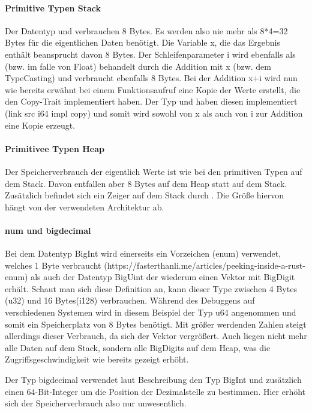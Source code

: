 \documentclass[11pt,a4paper, ngerman]{article}
\begin{document}
\paragraph{Primitive Typen Stack} Der Datentyp  und  verbrauchen 8 Bytes. Es werden also nie mehr als 8*4=32 Bytes für die eigentlichen Daten benötigt. Die Variable x, die das Ergebnis enthält beansprucht davon 8 Bytes. Der Schleifenparameter i wird ebenfalls als  (bzw.  im falle von Float) behandelt durch die Addition mit x (bzw. dem TypeCasting) und verbraucht ebenfalls 8 Bytes. Bei der Addition x+i wird nun wie bereits erwähnt bei einem Funktionsaufruf eine Kopie der Werte erstellt, die den Copy-Trait implementiert haben. Der Typ  und  haben diesen implementiert (link src i64 impl copy) und somit wird sowohl von x als auch von i zur Addition eine Kopie erzeugt.

\paragraph{Primitivee Typen Heap} Der Speicherverbrauch der eigentlich Werte ist wie bei den primitiven Typen auf dem Stack. Davon entfallen aber 8 Bytes auf dem Heap statt auf dem Stack. Zusätzlich befindet sich ein Zeiger auf dem Stack durch . Die Größe hiervon hängt von der verwendeten Architektur ab.

\paragraph{num und bigdecimal} Bei dem Datentyp BigInt wird einerseits ein Vorzeichen (enum) verwendet, welches 1 Byte verbraucht (https://fasterthanli.me/articles/peeking-inside-a-rust-enum) als auch der Datentyp BigUint der wiederum einen Vektor mit BigDigit erhält. Schaut man sich diese Definition an, kann dieser Type zwischen 4 Bytes (u32) und 16 Bytes(i128) verbrauchen. Während des Debuggens auf verschiedenen Systemen wird in diesem Beispiel der Typ u64 angenommen und somit ein Speicherplatz von 8 Bytes benötigt. Mit größer werdenden Zahlen steigt allerdings dieser Verbrauch, da sich der Vektor vergrößert. Auch liegen nicht mehr alle Daten auf dem Stack, sondern alle BigDigits auf dem Heap, was die Zugriffsgeschwindigkeit wie bereits gezeigt erhöht.

Der Typ bigdecimal verwendet laut Beschreibung den Typ BigInt und zusätzlich einen 64-Bit-Integer um die Position der Dezimalstelle zu bestimmen. Hier erhöht sich der Speicherverbrauch also nur unwesentlich.
\end{document}
